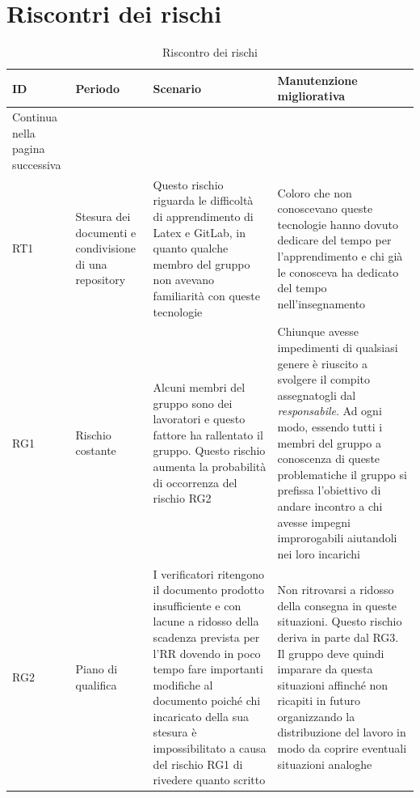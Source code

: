 \appendix
\section{Riscontri dei rischi}
\begin{center}
    \renewcommand{\arraystretch}{2.2}
    
    \begin{longtable}{ p{} p{} p{} p{}}

        \rowcolor[HTML]{232f3e}
    
        \rowcolors{3}{tableRow}{}
        \color[HTML]{FFFFFF} \textbf{ID} & \color[HTML]{FFFFFF} \centering\textbf{Periodo} & \color[HTML]{FFFFFF} \textbf{Scenario} & \color[HTML]{FFFFFF} \textbf{Manutenzione migliorativa}\\
    \endhead
    \rowcolor{white}\multicolumn{3}{c}
    { Continua nella pagina successiva} \\
    \endfoot
    \caption{Riscontro dei rischi}
        \label{tab:risc}
    \endlastfoot
    RT1 & Stesura dei documenti e condivisione di una repository & Questo rischio riguarda le difficoltà di apprendimento di Latex e GitLab, in quanto qualche membro del gruppo non avevano familiarità con queste tecnologie & Coloro che non conoscevano queste tecnologie hanno dovuto dedicare del tempo per l'apprendimento e chi già le conosceva ha dedicato del tempo nell'insegnamento\\
    
    RG1 & Rischio costante & Alcuni membri del gruppo sono dei lavoratori e questo fattore ha rallentato il gruppo. Questo rischio aumenta la probabilità di occorrenza del rischio RG2 & Chiunque avesse impedimenti di qualsiasi genere è riuscito a svolgere il compito assegnatogli dal \textit{responsabile}. Ad ogni modo, essendo tutti i membri del gruppo a conoscenza di queste problematiche il gruppo si prefissa l'obiettivo di andare incontro a chi avesse impegni improrogabili aiutandoli nei loro incarichi\\
    
    RG2 & Piano di qualifica & I verificatori ritengono il documento prodotto insufficiente e con lacune a ridosso della scadenza prevista per l'RR dovendo in poco tempo fare importanti modifiche al documento poiché chi incaricato della sua stesura è impossibilitato a causa del rischio RG1 di rivedere quanto scritto & Non ritrovarsi a ridosso della consegna in queste situazioni. Questo rischio deriva in parte dal RG3. Il gruppo deve quindi imparare da questa situazioni affinché non ricapiti in futuro organizzando la distribuzione del lavoro in modo da coprire eventuali situazioni analoghe \\


\end{longtable}
\end{center}
